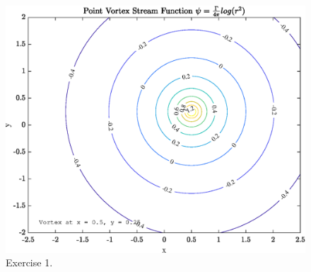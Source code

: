 



\begin{figure}[h]
\centering
\includegraphics[scale=0.8]{Week_1_jc2071/Exercise_1_jc2071/Exercise_1_coutour_plot.eps}
\caption{Exercise 1.}
\label{foobar-figure}
\end{figure}